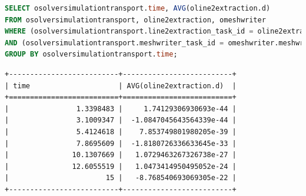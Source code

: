 \begin{lstlisting}[language=sql,deletendkeywords={TIME},label={lst:experiments-1-sql},caption={[Código em SQL gerado na consulta~\#1]Código em SQL gerado na consulta~\#1. Tempo médio de geração: 40,29~ms.}]
SELECT osolversimulationtransport.time, AVG(oline2extraction.d)
FROM osolversimulationtransport, oline2extraction, omeshwriter
WHERE (osolversimulationtransport.line2extraction_task_id = oline2extraction.line2extraction_task_id) 
AND (osolversimulationtransport.meshwriter_task_id = omeshwriter.meshwriter_task_id)
GROUP BY osolversimulationtransport.time;
\end{lstlisting}

\begin{center}
\begin{lstlisting}[language=sqlresults,label={lst:experiments-1-sqlresults},caption={[Resultados da consulta \#1.]Resultados da consulta \#1. Tempo médio de execução: 4,35~ms.}]
+--------------------------+--------------------------+
| time                     | AVG(oline2extraction.d)  |
+==========================+==========================+
|                1.3398483 |     1.74129306930693e-44 |
|                3.1009347 |  -1.0847045643564339e-44 |
|                5.4124618 |    7.853749801980205e-39 |
|                7.8695609 |  -1.8180726336633645e-33 |
|               10.1307669 |   1.0729463267326738e-27 |
|               12.6055519 |   1.0473414950495052e-24 |
|                       15 |   -8.768540693069305e-22 |
+--------------------------+--------------------------+
\end{lstlisting}
\end{center}

